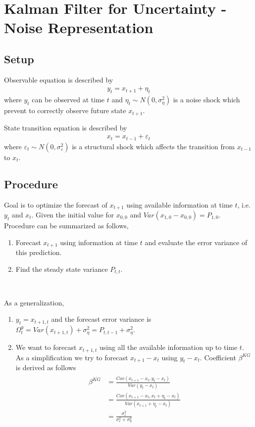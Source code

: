 \documentclass[14pt]{article}
\begin{document}
	
	\large{

\section*{Kalman Filter for Uncertainty - Noise Representation}

\subsection*{Setup}

Observable equation is described by
\begin{eqnarray}
y_t = x_{t+1} + \eta_t
\end{eqnarray}
where $y_t$ can be observed at time $t$ and $\eta_t \sim N(0,\sigma^2_{\eta})$ is a noise shock which prevent to correctly observe future state $x_{t+1}$.


State transition equation is described by
\begin{eqnarray}
x_{t} = x_{t-1} + \varepsilon_t
\end{eqnarray}
where $\varepsilon_t \sim N(0,\sigma^2_{\varepsilon})$ is a structural shock which affects the transition from $x_{t-1}$ to $x_t$.

\subsection*{Procedure}

Goal is to optimize the forecast of $x_{t+1}$ using available information at time $t$, i.e. $y_t$ and $x_t$. Given the initial value for $x_{0,0}$ and $Var(x_{1,0} - x_{0,0}) = P_{1,0}$. Procedure can be summarized as follows,
\begin{enumerate}
	\item Forecast $x_{t+1}$ using information at time $t$ and evaluate the error variance of this prediction.
	\item Find the steady state variance $P_{t,t}$.
\end{enumerate}

\ 

As a generalization, 
\begin{enumerate}
	\item $y_{t} = x_{t+1,t}$ and the forecast error variance is $\Omega^y_{t} = Var(x_{t+1,t}) + \sigma^2_{\eta} = P_{t,t-1} + \sigma^2_{\eta}$.
	\item We want to forecast $x_{t+1,t}$ using all the available information up to time $t$. As a simplification we try to forecast $x_{t+1} -  x_{t}$ using $y_t -  x_{t}$.
	Coefficient $\beta^{KG}$ is derived as follows
	\begin{eqnarray}
	\begin{aligned}
	\beta^{KG} &= \frac{Cov(x_{t+1} -  x_{t}, y_t - x_{t})}{Var(y_t -  x_{t})}  \\
	             &= \frac{Cov(x_{t+1} - x_{t},  x_t + \eta_t -  x_{t})}{Var( x_{t+1} + \eta_t - x_{t})} \\
	             &= \frac{\sigma^2_{\varepsilon}}{\sigma^2_{\varepsilon} + \sigma^2_{\eta}} 
	\end{aligned}
	\end{eqnarray}
	

\end{enumerate}}
\end{document}
